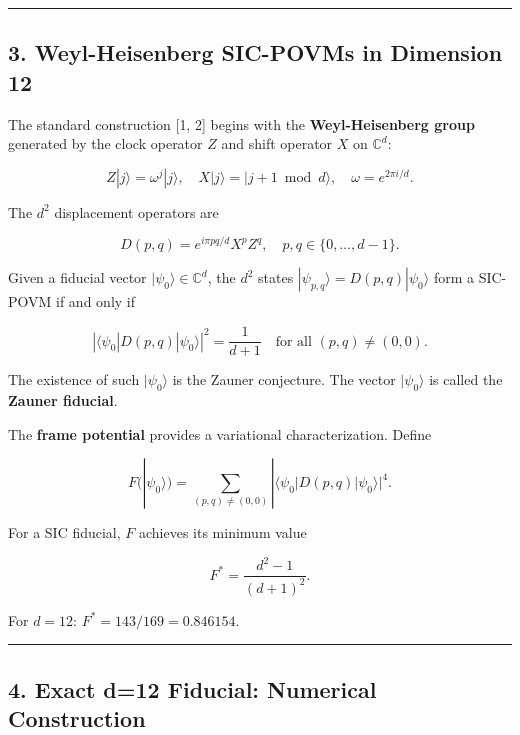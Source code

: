 \documentclass[12pt,a4paper]{article}
\begin{document}
\begin{center}\rule{0.5\linewidth}{0.5pt}\end{center}

\hypertarget{weyl-heisenberg-sic-povms-in-dimension-12}{%
\subsection{3. Weyl-Heisenberg SIC-POVMs in Dimension
12}\label{weyl-heisenberg-sic-povms-in-dimension-12}}

The standard construction {[}1, 2{]} begins with the
\textbf{Weyl-Heisenberg group} generated by the clock operator \(Z\) and
shift operator \(X\) on \(\mathbb{C}^d\):

\[Z|j\rangle = \omega^j |j\rangle, \quad X|j\rangle = |j+1 \bmod d\rangle, \quad \omega = e^{2\pi i/d}.\]

The \(d^2\) displacement operators are

\[D(p,q) = e^{i\pi pq/d} X^p Z^q, \quad p, q \in \{0, \ldots, d-1\}.\]

Given a fiducial vector \(|\psi_0\rangle \in \mathbb{C}^d\), the \(d^2\)
states \(|\psi_{p,q}\rangle = D(p,q)|\psi_0\rangle\) form a SIC-POVM if
and only if

\[|\langle \psi_0 | D(p,q) | \psi_0 \rangle|^2 = \frac{1}{d+1} \quad \text{for all } (p,q) \neq (0,0).\]

The existence of such \(|\psi_0\rangle\) is the Zauner conjecture. The
vector \(|\psi_0\rangle\) is called the \textbf{Zauner fiducial}.

The \textbf{frame potential} provides a variational characterization.
Define

\[F(|\psi_0\rangle) = \sum_{(p,q) \neq (0,0)} |\langle \psi_0 | D(p,q) | \psi_0 \rangle|^4.\]

For a SIC fiducial, \(F\) achieves its minimum value

\[F^* = \frac{d^2 - 1}{(d+1)^2}.\]

For \(d = 12\): \(F^* = 143/169 = 0.846154\).

\begin{center}\rule{0.5\linewidth}{0.5pt}\end{center}

\hypertarget{exact-d12-fiducial-numerical-construction}{%
\subsection{4. Exact d=12 Fiducial: Numerical
Construction}\label{exact-d12-fiducial-numerical-construction}}
\end{document}
